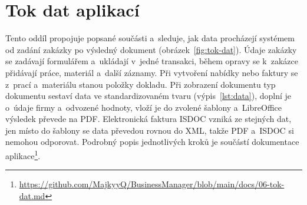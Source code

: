 \section{Tok dat aplikací}\label{sec:tok-dat}

Tento oddíl propojuje popsané součásti a~sleduje, jak data procházejí systémem od zadání zakázky po výsledný dokument (obrázek~\ref{fig:tok-dat}). Údaje zakázky se zadávají formulářem a~ukládají v~jedné transakci, během opravy se k~zakázce přidávají práce, materiál a~další záznamy. Při vytvoření nabídky nebo faktury se z~prací a~materiálu stanou položky dokladu. Při zobrazení dokumentu typ dokumentu sestaví data ve standardizovaném tvaru (výpis~\ref{lst:data}), doplní je o~údaje firmy a~odvozené hodnoty, vloží je do zvolené šablony a~LibreOffice výsledek převede na PDF. Elektronická faktura ISDOC vzniká ze stejných dat, jen místo do šablony se data převedou rovnou do XML, takže PDF a~ISDOC si nemohou odporovat. Podrobný popis jednotlivých kroků je součástí dokumentace aplikace\footnote{\url{https://github.com/MajkyyQ/BusinessManager/blob/main/docs/06-tok-dat.md}}.

